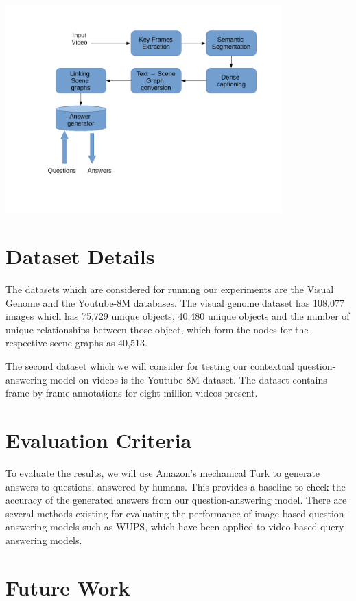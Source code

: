 \documentclass[sigconf]{acmart}
\begin{document}
\clearpage
\begin{strip}
\centering
\includegraphics[width=0.8\textwidth]{images/proposal-pipeline.png}
\end{strip}  

\section{Dataset Details}
\label{sec-5}
The datasets which are considered for running our experiments are
the Visual Genome and the Youtube-8M databases.  The visual genome
dataset has 108,077 images which has 75,729 unique objects, 40,480
unique objects and the number of unique relationships between those
object, which form the nodes for the respective scene graphs as
40,513.

The second dataset which we will consider for testing our contextual
question-answering model on videos is the Youtube-8M dataset. The
dataset contains frame-by-frame annotations for eight million videos
present.

\section{Evaluation Criteria}
\label{sec-6}
To evaluate the results, we will use Amazon’s mechanical Turk to
generate answers to questions, answered by humans. This provides a
baseline to check the accuracy of the generated answers from our
question-answering model. There are several methods existing for
evaluating the performance of image based question-answering models
such as WUPS, which have been applied to video-based query answering
models.

\section{Future Work}
\label{sec-7}
\end{document}
